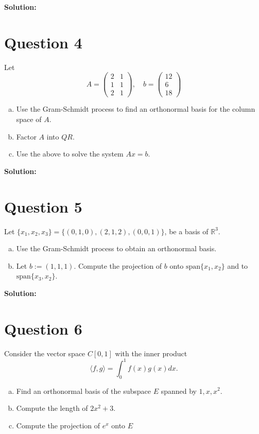 \documentclass{article}
\begin{document}
\vspace{0.25cm}\noindent\textbf{Solution:}

\section*{Question 4}
Let 
$$ A = \begin{pmatrix} 2 & 1 \\ 1 & 1 \\ 2 & 1 \end{pmatrix}, \quad
   b = \begin{pmatrix} 12 \\ 6 \\ 18 \end{pmatrix} $$
\begin{enumerate}[a.]
    \item Use the Gram-Schmidt process to find an orthonormal basis for the column space of $A$.
    \item Factor $A$ into $QR$.
    \item Use the above to solve the system $Ax = b$.
\end{enumerate}

\vspace{0.25cm}\noindent\textbf{Solution:}

\section*{Question 5}
Let $\{x_1, x_2, x_3\} = \{(0, 1, 0), (2, 1, 2), (0, 0, 1)\}$, be a basis of $\mathbb{R}^3$.
\begin{enumerate}[a.]
    \item Use the Gram-Schmidt process to obtain an orthonormal basis.
    \item Let $ b := (1, 1, 1) $. Compute the projection of $ b $ onto $\text{span}\{x_1, x_2\}$ and to $\text{span}\{x_3, x_2\}$.
\end{enumerate}

\vspace{0.25cm}\noindent\textbf{Solution:}

\section*{Question 6}
Consider the vector space \(C[0,1]\) with the inner product
$$ \langle f, g \rangle = \int_{0}^{1} f(x)g(x)dx. $$
\begin{enumerate}[a.]
    \item Find an orthonormal basis of the subspace \(E\) spanned by \(1, x, x^2\).
    \item Compute the length of \(2x^2 + 3\).
    \item Compute the projection of \(e^x\) onto \(E\)
\end{enumerate}
\end{document}
